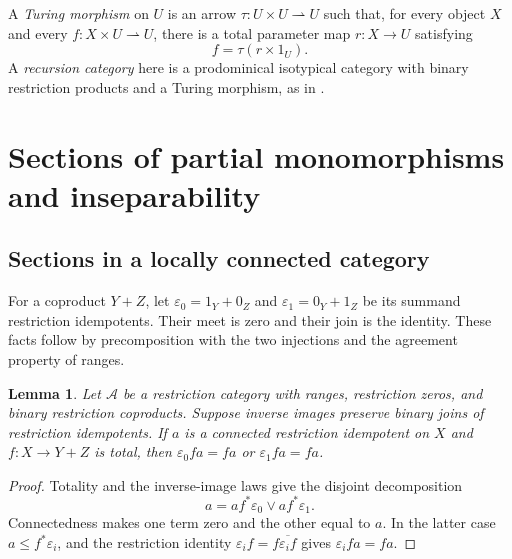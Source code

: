 \documentclass[11pt]{article}
\newtheorem{lemma}[theorem]{Lemma}
\begin{document}
A \emph{Turing morphism} on $U$ is an arrow
$\tau:U\times U\rightharpoonup U$ such that, for every object $X$
and every $f:X\times U\rightharpoonup U$, there is a total
parameter map $r:X\to U$ satisfying
\[
 f=\tau(r\times1_U).
\]
A \emph{recursion category} here is a prodominical isotypical
category with binary restriction products and a Turing morphism,
as in \cite[Section 9]{Heller}.

\section{Sections of partial monomorphisms and inseparability}\label{sec:lifting}

\subsection{Sections in a locally connected category}

For a coproduct $Y+Z$, let
$\varepsilon_0=1_Y+0_Z$ and $\varepsilon_1=0_Y+1_Z$ be its summand
restriction idempotents. Their meet is zero and their join is the identity. These facts
follow by precomposition with the two injections and the agreement
property of ranges.

\begin{lemma}\label{lem:connected-alternative}
Let $\mathcal A$ be a restriction category with ranges, restriction zeros,
and binary restriction coproducts. Suppose inverse images preserve binary
joins of restriction idempotents. If $a$ is a connected restriction
idempotent on $X$ and
$f:X\to Y+Z$ is total, then
$\varepsilon_0fa=fa$ or $\varepsilon_1fa=fa$.
\end{lemma}
\begin{proof}
Totality and the inverse-image laws give the disjoint decomposition
\[
 a=af^*\varepsilon_0\vee af^*\varepsilon_1.
\]
Connectedness makes one term zero and the other equal to $a$. In the
latter case $a\le f^*\varepsilon_i$, and the restriction identity
$\varepsilon_i f=f\overline{\varepsilon_i f}$ gives
$\varepsilon_i fa=fa$.
\end{proof}
\end{document}
